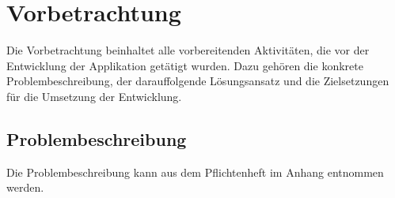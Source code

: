 \documentclass[12pt,a4paper]{article}
\begin{document}
\section{Vorbetrachtung}
Die Vorbetrachtung beinhaltet alle vorbereitenden Aktivitäten, die vor der Entwicklung der Applikation getätigt wurden. Dazu gehören die konkrete Problembeschreibung, der darauffolgende Lösungsansatz und die Zielsetzungen für die Umsetzung der Entwicklung.


\subsection{Problembeschreibung}

Die Problembeschreibung kann aus dem Pflichtenheft im Anhang entnommen werden.

\end{document}
